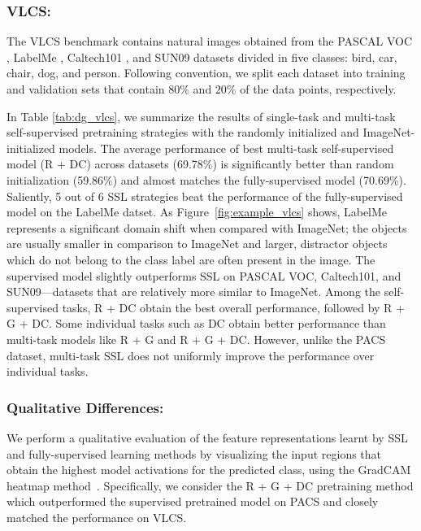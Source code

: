 \documentclass[runningheads]{llncs}
\begin{document}
\vspace{-5pt}\subsubsection{VLCS:} The VLCS benchmark \cite{fang2013unbiased} contains natural images obtained from the PASCAL VOC \cite{everingham2010pascal}, LabelMe \cite{russell2008labelme}, Caltech101 \cite{fei2004learning}, and SUN09 \cite{choi2010exploiting} datasets divided in five classes: bird, car, chair, dog, and person. Following convention, we split each dataset into training and validation sets that contain $80\%$ and $20\%$ of the data points, respectively. 

In Table \ref{tab:dg_vlcs}, we summarize the results of  single-task and multi-task self-supervised pretraining strategies with the randomly initialized and ImageNet-initialized models. The average performance of best multi-task self-supervised model (R + DC) across datasets (69.78\%) is significantly better than random initialization (59.86\%) and almost matches the fully-supervised model (70.69\%). Saliently, 5 out of 6 SSL strategies beat the performance of the fully-supervised model on the LabelMe datset. As Figure~\ref{fig:example_vlcs} shows, LabelMe represents a significant domain shift when compared with ImageNet; the objects are usually smaller in comparison to ImageNet and larger, distractor objects which do not belong to the class label are often  present in the image. The supervised model slightly outperforms SSL on PASCAL VOC,  Caltech101, and SUN09---datasets that are relatively more similar to ImageNet.
Among the self-supervised tasks, R + DC obtain the best overall performance, followed by R + G + DC. Some individual tasks such as DC obtain better performance than multi-task models like R + G and R + G + DC. However, unlike the PACS dataset, multi-task SSL does not uniformly improve the performance over individual tasks. 


\vspace{-5pt}\subsubsection{Qualitative Differences:} 
We perform a qualitative evaluation of the feature representations learnt by SSL and fully-supervised learning methods by visualizing the input regions that obtain the highest model activations for the predicted class, using the GradCAM heatmap method~\cite{selvaraju2017grad}. Specifically, we consider the R + G + DC pretraining method which outperformed the supervised pretrained model on PACS and closely matched the performance on VLCS. 
\end{document}
